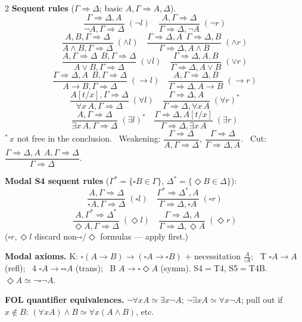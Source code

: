 \documentclass[11pt,a4paper]{article}
\newcommand{\seq}{\Rightarrow}
\newcommand{\imp}{\rightarrow}
\newcommand{\eq}{\simeq}
\newcommand{\rn}[1]{\;({#1})}
\begin{document}
\begin{footnotesize}
\begin{multicols}{2}
\textbf{Sequent rules} ($\Gamma\seq\Delta$; basic $A,\Gamma\seq A,\Delta$).
\[\dfrac{\Gamma\seq\Delta,A}{\neg A,\Gamma\seq\Delta}\rn{\neg l}\quad
\dfrac{A,\Gamma\seq\Delta}{\Gamma\seq\Delta,\neg A}\rn{\neg r}\]
\[\dfrac{A,B,\Gamma\seq\Delta}{A\wedge B,\Gamma\seq\Delta}\rn{\wedge l}\quad
\dfrac{\Gamma\seq\Delta,A\ \ \Gamma\seq\Delta,B}{\Gamma\seq\Delta,A\wedge B}\rn{\wedge r}\]
\[\dfrac{A,\Gamma\seq\Delta\ \ B,\Gamma\seq\Delta}{A\vee B,\Gamma\seq\Delta}\rn{\vee l}\quad
\dfrac{\Gamma\seq\Delta,A,B}{\Gamma\seq\Delta,A\vee B}\rn{\vee r}\]
\[\dfrac{\Gamma\seq\Delta,A\ \ B,\Gamma\seq\Delta}{A\imp B,\Gamma\seq\Delta}\rn{\imp l}\quad
\dfrac{A,\Gamma\seq\Delta,B}{\Gamma\seq\Delta,A\imp B}\rn{\imp r}\]
\[\dfrac{A[t/x],\Gamma\seq\Delta}{\forall x\,A,\Gamma\seq\Delta}\rn{\forall l}\quad
\dfrac{\Gamma\seq\Delta,A}{\Gamma\seq\Delta,\forall x\,A}\rn{\forall r}^{*}\]
\[\dfrac{A,\Gamma\seq\Delta}{\exists x\,A,\Gamma\seq\Delta}\rn{\exists l}^{*}\quad
\dfrac{\Gamma\seq\Delta,A[t/x]}{\Gamma\seq\Delta,\exists x\,A}\rn{\exists r}\]
$^{*}$\,$x$ not free in the conclusion. \ Weakening: $\dfrac{\Gamma\seq\Delta}{A,\Gamma\seq\Delta}$, $\dfrac{\Gamma\seq\Delta}{\Gamma\seq\Delta,A}$. \ Cut: $\dfrac{\Gamma\seq\Delta,A\ \ A,\Gamma\seq\Delta}{\Gamma\seq\Delta}$.

\textbf{Modal S4 sequent rules} ($\Gamma^{*}{=}\{\square B\in\Gamma\}$, $\Delta^{*}{=}\{\Diamond B\in\Delta\}$):
\[\dfrac{A,\Gamma\seq\Delta}{\square A,\Gamma\seq\Delta}\rn{\square l}\quad
\dfrac{\Gamma^{*}\seq\Delta^{*},A}{\Gamma\seq\Delta,\square A}\rn{\square r}\]
\[\dfrac{A,\Gamma^{*}\seq\Delta^{*}}{\Diamond A,\Gamma\seq\Delta}\rn{\Diamond l}\quad
\dfrac{\Gamma\seq\Delta,A}{\Gamma\seq\Delta,\Diamond A}\rn{\Diamond r}\]
($\square r,\Diamond l$ discard non-$\square$/$\Diamond$ formulas --- apply first.)

\textbf{Modal axioms.} K: $\square(A\imp B)\imp(\square A\imp\square B)$ $+$ necessitation $\frac{A}{\square A}$; \ T $\square A\imp A$ (refl); \ 4 $\square A\imp\square\square A$ (trans); \ B $A\imp\square\Diamond A$ (symm). S4$=$T4, S5$=$T4B. $\Diamond A\eq\neg\square\neg A$.

\textbf{FOL quantifier equivalences.} $\neg\forall x A\eq\exists x\neg A$; $\neg\exists xA\eq\forall x\neg A$; pull out if $x\notin B$: $(\forall xA)\wedge B\eq\forall x(A\wedge B)$, etc.

\end{multicols}
\end{footnotesize}
\end{document}
